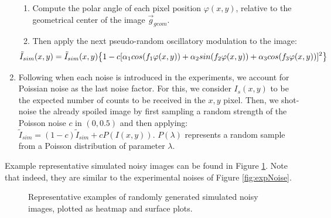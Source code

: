 \documentclass[11pt, a4paper, twoside]{article} %
\begin{document}
\begin{enumerate}
\begin{enumerate}
\item Compute the polar angle of each pixel position $\varphi(x,y)$, relative to the geometrical center of the image $\vec{g}_{geom}$.
\item Then apply the next pseudo-random oscillatory modulation to the image:
\begin{equation}\hspace*{-0.6cm}
\tilde{I}_{sim}(x,y) = \tilde{I}_{sim}(x,y)\qty{1-c[\alpha_1cos(f_1\varphi(x,y)) +\alpha_2sin(f_2\varphi(x,y)) +\alpha_3cos(f_3\varphi(x,y))]^2}
\end{equation}
\end{enumerate}
\item Following when each noise is introduced in the experiments, we account for Poissian noise as the last noise factor. For this, we consider $I_s(x,y)$ to be the expected number of counts to be received in the $x,y$ pixel. Then, we shot-noise the already spoiled image by first sampling a random strength of the Poisson noise $c$ in $(0,0.5)$ and then applying: $\tilde{I}_{sim}=(1-c)\tilde{I}_{sim}+cP(I(x,y))$. $P(\lambda)$ represents a random sample from a Poisson distribution of parameter $\lambda$.
\end{enumerate}
Example representative simulated noisy images can be found in Figure \ref{fig:artifNoise}. Note that indeed, they are similar to the experimental noises of Figure \ref{fig:expNoise}.

\begin{figure}[h!] 
     \centering 
    \caption{Representative examples of randomly generated simulated noisy images, plotted as heatmap and surface plots.}
    \label{fig:artifNoise}
\end{figure}
\end{document}
